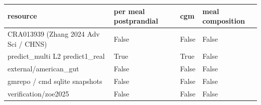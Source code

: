 {\footnotesize\setlength{\tabcolsep}{3pt}
\begin{longtable}{llll}
\toprule
\textbf{resource} & \textbf{per meal postprandial} & \textbf{cgm} & \textbf{meal composition} \\
\midrule
\endhead
CRA013939 (Zhang 2024 Adv Sci / CHNS) & False & False & False \\
predict\_multi L2 predict1\_real & True & True & False \\
external/american\_gut & False & False & False \\
gmrepo / cmd sqlite snapshots & False & False & False \\
verification/zoe2025 & False & False & False \\
\bottomrule
\end{longtable}}
